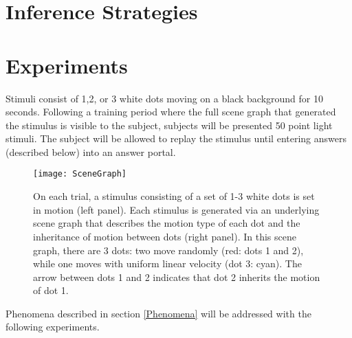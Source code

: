 \documentclass{scrartcl}
\begin{document}
    
  
 \section{Inference Strategies}  








\section{Experiments}

Stimuli consist of 1,2, or 3 white dots moving on a black background for 10 seconds. Following a training period where the full scene graph that generated the stimulus is visible to the subject, subjects will be presented 50 point light stimuli. The subject will be allowed to replay the stimulus until entering answers (described below) into an answer portal. 

\begin{figure}[h]
    \centering
    \texttt{[image: SceneGraph]}
    \caption{On each trial, a stimulus consisting of a set of 1-3 white dots is set in motion (left panel). Each stimulus is generated via an underlying scene graph that describes the motion type of each dot and the inheritance of motion between dots (right panel). In this scene graph, there are 3 dots: two move randomly (red: dots 1 and 2), while one moves with uniform linear velocity (dot 3: cyan). The arrow between dots 1 and 2 indicates that dot 2 inherits the motion of dot 1.}
    \label{fig:scenegraph}
\end{figure}

Phenomena described in section \ref{Phenomena} will be addressed with the following experiments.
\end{document}
